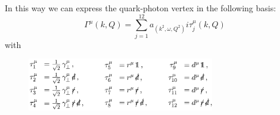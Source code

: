 \begin{frame}
    In this way we can express the quark-photon vertex in the following basis:
    \begin{equation}\label{eq:8}
        \Gamma^\mu(k, Q)=\sum_{j=1}^{12}a_(k^2, \omega, Q^2)i\tau_j^\mu(k,Q)
    \end{equation}
    with
    \begin{figure}
        \includegraphics[width=\linewidth,  height=2.3cm]{graphics/taus}
        \label{fig:taus}
    \end{figure}
\end{frame}
\endinput
